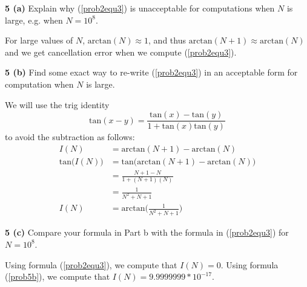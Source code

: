 \documentclass[12pt]{article}
\begin{document}
\hspace{-7 ex}\textbf{5 (a)} Explain why (\ref{prob2equ3}) is unacceptable for computations when $N$ is large, e.g. when $N = 10^8$. \bigbreak

	For large values of $N$, $\text{arctan}(N) \approx 1$, and thus $\text{arctan}(N+1) \approx \text{arctan}(N)$ and we get cancellation error when we compute (\ref{prob2equ3}). \bigbreak
	
\hspace{-7 ex}\textbf{5 (b)} Find some exact way to re-write (\ref{prob2equ3}) in an acceptable form for computation when $N$ is large. \bigbreak
	
	We will use the trig identity $$ \text{tan}(x-y) = \frac{\text{tan}(x) - \text{tan}(y)}{1 + \text{tan}(x)\text{tan}(y)}$$ to avoid the subtraction as follows: \\
	\begin{align}
		I(N) & = \text{arctan}(N+1) - \text{arctan}(N) \nonumber \\
		\text{tan}\big(I(N)\big) & = \text{tan}\big(\text{arctan}(N+1) - \text{arctan}(N) \big) \nonumber \\
		& = \frac{N + 1 - N}{1 + (N+1)(N)} \nonumber \\
		& = \frac{1}{N^2 + N + 1} \nonumber \\
		I(N) & = \text{arctan}\bigg(\frac{1}{N^2 + N + 1}\bigg) \label{prob5b}
	\end{align}
	
\hspace{-7 ex}\textbf{5 (c)} Compare your formula in Part b with the formula in (\ref{prob2equ3}) for $N = 10^8$. \bigbreak

	Using formula (\ref{prob2equ3}), we compute that $I(N) = 0$. Using formula (\ref{prob5b}), we compute that $I(N) = 9.9999999*10^{-17}$. \bigbreak
	
\end{document}
